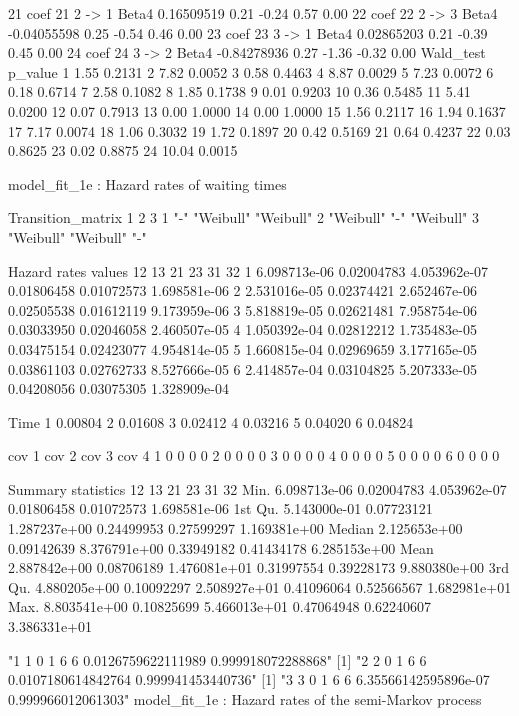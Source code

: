 \documentclass[11pt,a4paper]{article}
\begin{document}
\begin{Schunk}
\begin{Soutput}
21 coef    21     2 -> 1      Beta4  0.16509519 0.21    -0.24     0.57    0.00
22 coef    22     2 -> 3      Beta4 -0.04055598 0.25    -0.54     0.46    0.00
23 coef    23     3 -> 1      Beta4  0.02865203 0.21    -0.39     0.45    0.00
24 coef    24     3 -> 2      Beta4 -0.84278936 0.27    -1.36    -0.32    0.00
   Wald_test p_value
1       1.55  0.2131
2       7.82  0.0052
3       0.58  0.4463
4       8.87  0.0029
5       7.23  0.0072
6       0.18  0.6714
7       2.58  0.1082
8       1.85  0.1738
9       0.01  0.9203
10      0.36  0.5485
11      5.41  0.0200
12      0.07  0.7913
13      0.00  1.0000
14      0.00  1.0000
15      1.56  0.2117
16      1.94  0.1637
17      7.17  0.0074
18      1.06  0.3032
19      1.72  0.1897
20      0.42  0.5169
21      0.64  0.4237
22      0.03  0.8625
23      0.02  0.8875
24     10.04  0.0015
\end{Soutput}
\begin{Soutput}
model_fit_1e  : Hazard rates of waiting times

Transition_matrix
  1         2         3        
1 "-"       "Weibull" "Weibull"
2 "Weibull" "-"       "Weibull"
3 "Weibull" "Weibull" "-"      

Hazard rates values 
            12         13           21         23         31           32
1 6.098713e-06 0.02004783 4.053962e-07 0.01806458 0.01072573 1.698581e-06
2 2.531016e-05 0.02374421 2.652467e-06 0.02505538 0.01612119 9.173959e-06
3 5.818819e-05 0.02621481 7.958754e-06 0.03033950 0.02046058 2.460507e-05
4 1.050392e-04 0.02812212 1.735483e-05 0.03475154 0.02423077 4.954814e-05
5 1.660815e-04 0.02969659 3.177165e-05 0.03861103 0.02762733 8.527666e-05
6 2.414857e-04 0.03104825 5.207333e-05 0.04208056 0.03075305 1.328909e-04

     Time
1 0.00804
2 0.01608
3 0.02412
4 0.03216
5 0.04020
6 0.04824

  cov 1 cov 2 cov 3 cov 4
1     0     0     0     0
2     0     0     0     0
3     0     0     0     0
4     0     0     0     0
5     0     0     0     0
6     0     0     0     0

Summary statistics
                  12         13           21         23         31           32
Min.    6.098713e-06 0.02004783 4.053962e-07 0.01806458 0.01072573 1.698581e-06
1st Qu. 5.143000e-01 0.07723121 1.287237e+00 0.24499953 0.27599297 1.169381e+00
Median  2.125653e+00 0.09142639 8.376791e+00 0.33949182 0.41434178 6.285153e+00
Mean    2.887842e+00 0.08706189 1.476081e+01 0.31997554 0.39228173 9.880380e+00
3rd Qu. 4.880205e+00 0.10092297 2.508927e+01 0.41096064 0.52566567 1.682981e+01
Max.    8.803541e+00 0.10825699 5.466013e+01 0.47064948 0.62240607 3.386331e+01
\end{Soutput}
\begin{Soutput}
[1] "1 1 0 1 6 6 0.0126759622111989 0.999918072288868"
[1] "2 2 0 1 6 6 0.0107180614842764 0.999941453440736"
[1] "3 3 0 1 6 6 6.35566142595896e-07 0.999966012061303"
model_fit_1e  : Hazard rates of the semi-Markov process


\end{Soutput}
\end{Schunk}
\end{document}

